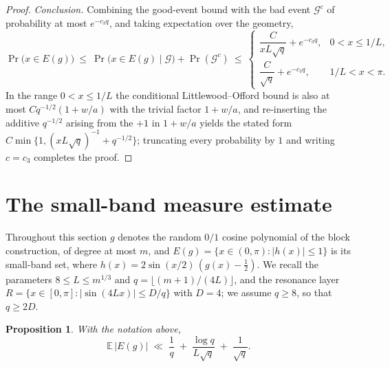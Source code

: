 \documentclass[11pt,reqno]{amsart}
\theoremstyle{plain}
\newtheorem{proposition}{Proposition}
\theoremstyle{definition}
\theoremstyle{remark}
\begin{document}
\begin{proof}
\emph{Conclusion.} Combining the good-event bound with the bad event $\mathcal{G}^c$ of probability at most $e^{-c_3 q}$, and taking expectation over the geometry,
\[
\Pr\big(x\in E(g)\big)\ \le\ \Pr\big(x\in E(g)\mid\mathcal G\big)+\Pr(\mathcal G^c)
\ \le\
\begin{cases}
\dfrac{C}{xL\sqrt q}+e^{-c_3 q}, & 0<x\le1/L,\\[2mm]
\dfrac{C}{\sqrt q}+e^{-c_3 q}, & 1/L<x<\pi.
\end{cases}
\]
In the range $0<x\le1/L$ the conditional Littlewood--Offord bound is also at most $C q^{-1/2}(1+w/a)$ with the trivial factor $1+w/a$, and re-inserting the additive $q^{-1/2}$ arising from the $+1$ in $1+w/a$ yields the stated form $C\min\{1,(xL\sqrt q)^{-1}+q^{-1/2}\}$; truncating every probability by $1$ and writing $c=c_3$ completes the proof.
\end{proof}

\section{The small-band measure estimate}

Throughout this section $g$ denotes the random $0/1$ cosine polynomial of the block construction, of degree at most $m$, and $E(g)=\{x\in(0,\pi):|h(x)|\le 1\}$ is its small-band set, where $h(x)=2\sin(x/2)\,(g(x)-\tfrac12)$. We recall the parameters $8\le L\le m^{1/3}$ and $q=\lfloor (m+1)/(4L)\rfloor$, and the resonance layer $R=\{x\in[0,\pi]:|\sin(4Lx)|\le D/q\}$ with $D=4$; we assume $q\ge 8$, so that $q\ge 2D$.

\begin{proposition}\label{prop:expected-measure}
With the notation above,
\[
\mathbb{E}\,|E(g)|\;\ll\;\frac{1}{q}\;+\;\frac{\log q}{L\sqrt{q}}\;+\;\frac{1}{\sqrt{q}}.
\]
\end{proposition}
\end{document}
